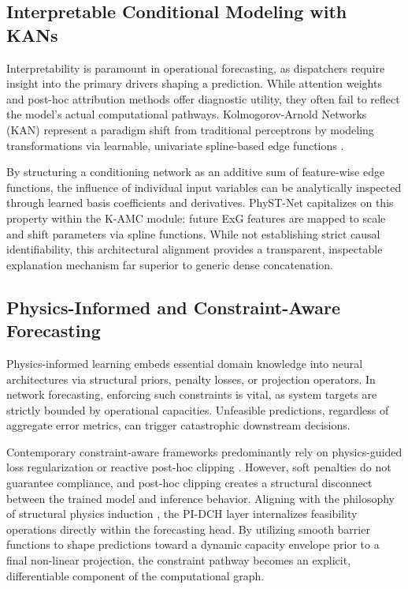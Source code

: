 \subsection{Interpretable Conditional Modeling with KANs}
\label{sec:related_interpretable_conditioning}
Interpretability is paramount in operational forecasting, as dispatchers require insight into the primary drivers shaping a prediction. While attention weights and post-hoc attribution methods offer diagnostic utility, they often fail to reflect the model's actual computational pathways. Kolmogorov-Arnold Networks (KAN) \cite{liu2024kan} represent a paradigm shift from traditional perceptrons by modeling transformations via learnable, univariate spline-based edge functions \cite{yamak2025review, han2024kan4tsf, vaca2024kan, xu2024kolmogorov}.

By structuring a conditioning network as an additive sum of feature-wise edge functions, the influence of individual input variables can be analytically inspected through learned basis coefficients and derivatives. PhyST-Net capitalizes on this property within the K-AMC module: future ExG features are mapped to scale and shift parameters via spline functions. While not establishing strict causal identifiability, this architectural alignment provides a transparent, inspectable explanation mechanism far superior to generic dense concatenation.

\subsection{Physics-Informed and Constraint-Aware Forecasting}
\label{sec:related_constraints}
Physics-informed learning embeds essential domain knowledge into neural architectures via structural priors, penalty losses, or projection operators. In network forecasting, enforcing such constraints is vital, as system targets are strictly bounded by operational capacities. Unfeasible predictions, regardless of aggregate error metrics, can trigger catastrophic downstream decisions.

Contemporary constraint-aware frameworks predominantly rely on physics-guided loss regularization \cite{liu2026geatformer, potosnak2024severe} or reactive post-hoc clipping \cite{welsh2025physics, PGNNTFT2025}. However, soft penalties do not guarantee compliance, and post-hoc clipping creates a structural disconnect between the trained model and inference behavior. Aligning with the philosophy of structural physics induction \cite{Shi2023UltraShort}, the PI-DCH layer internalizes feasibility operations directly within the forecasting head. By utilizing smooth barrier functions to shape predictions toward a dynamic capacity envelope prior to a final non-linear projection, the constraint pathway becomes an explicit, differentiable component of the computational graph.

